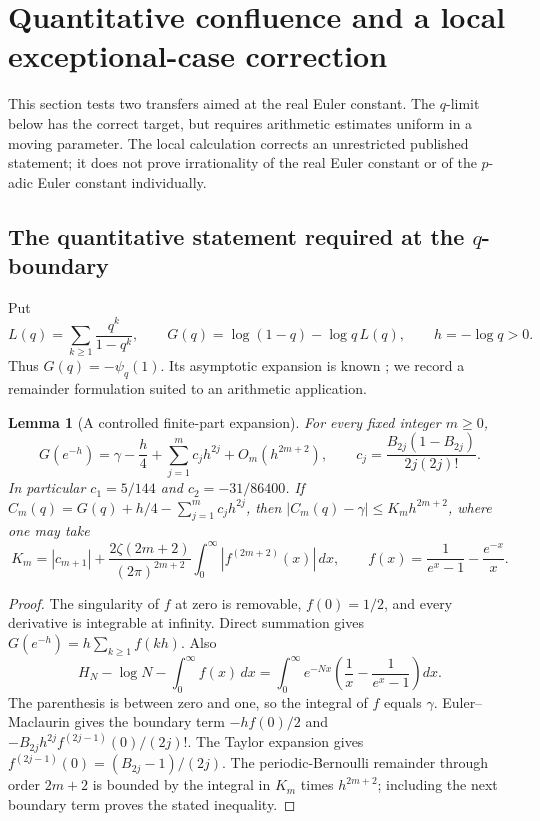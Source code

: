 \documentclass[11pt,a4paper]{article}
\newtheorem{lemma}[theorem]{Lemma}
\theoremstyle{definition}
\theoremstyle{remark}
\numberwithin{equation}{section}
\begin{document}
\section{Quantitative confluence and a local exceptional-case correction}
\label{p5:conf:sec}

This section tests two transfers aimed at the real Euler constant.  The
$q$-limit below has the correct target, but requires arithmetic estimates
uniform in a moving parameter.  The local calculation corrects an
unrestricted published statement; it does not prove irrationality of the
real Euler constant or of the $p$-adic Euler constant individually.

\subsection{The quantitative statement required at the \texorpdfstring{$q$}{q}-boundary}
Put
\[
 L(q)=\sum_{k\ge1}\frac{q^k}{1-q^k},\qquad
 G(q)=\log(1-q)-\log q\,L(q),\qquad h=-\log q>0.
\]
Thus $G(q)=-\psi_q(1)$.  Its asymptotic expansion is known
\cite{p5:conf:BW}; we record a remainder formulation suited to an
arithmetic application.

\begin{lemma}[A controlled finite-part expansion]\label{p5:conf:expansion}
For every fixed integer $m\ge0$,
\[
 G(e^{-h})=\gamma-\frac h4+
 \sum_{j=1}^m c_jh^{2j}+O_m(h^{2m+2}),\qquad
 c_j=\frac{B_{2j}(1-B_{2j})}{2j(2j)!}.
\]
In particular $c_1=5/144$ and $c_2=-31/86400$.
If $C_m(q)=G(q)+h/4-\sum_{j=1}^m c_jh^{2j}$, then
$|C_m(q)-\gamma|\le K_mh^{2m+2}$, where one may take
\[
 K_m=|c_{m+1}|+
 \frac{2\zeta(2m+2)}{(2\pi)^{2m+2}}
 \int_0^\infty|f^{(2m+2)}(x)|\,dx,
 \qquad f(x)=\frac1{e^x-1}-\frac{e^{-x}}x.
\]
\end{lemma}
\begin{proof}
The singularity of $f$ at zero is removable, $f(0)=1/2$, and every
derivative is integrable at infinity.  Direct summation gives
$G(e^{-h})=h\sum_{k\ge1}f(kh)$.  Also
\[
 H_N-\log N-\int_0^\infty f(x)\,dx
 =\int_0^\infty e^{-Nx}
 \left(\frac1x-\frac1{e^x-1}\right)dx.
\]
The parenthesis is between zero and one, so the integral of $f$ equals
$\gamma$.  Euler--Maclaurin gives the boundary term $-hf(0)/2$ and
$-B_{2j}h^{2j}f^{(2j-1)}(0)/(2j)!$.  The Taylor expansion gives
$f^{(2j-1)}(0)=(B_{2j}-1)/(2j)$.
The periodic-Bernoulli remainder through order $2m+2$ is bounded by
the integral in $K_m$ times $h^{2m+2}$; including the next boundary
term proves the stated inequality.
\end{proof}
\end{document}
